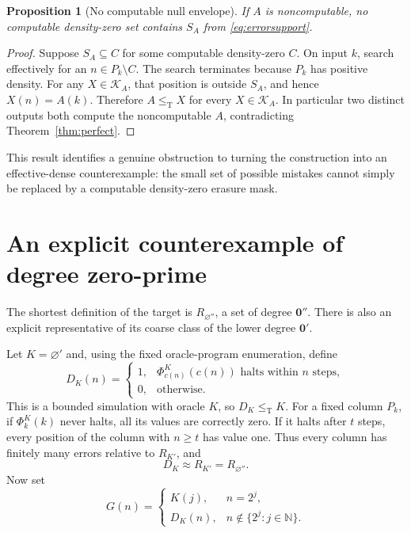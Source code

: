 \documentclass[11pt,a4paper]{article}
\newcommand{\N}{\mathbb N}
\newcommand{\leT}{\leq_{\mathrm T}}
\newcommand{\zero}{\mathbf 0}
\newtheorem{proposition}[theorem]{Proposition}
\theoremstyle{definition}\newtheorem{definition}[theorem]{Definition}
\theoremstyle{remark}\newtheorem{remark}[theorem]{Remark}
\begin{document}
\begin{proposition}[No computable null envelope]\label{prop:envelope}
If $A$ is noncomputable, no computable density-zero set contains $S_A$ from \eqref{eq:errorsupport}.
\end{proposition}
\begin{proof}
Suppose $S_A\subseteq C$ for some computable density-zero $C$. On input $k$, search effectively for an $n\in P_k\setminus C$. The search terminates because $P_k$ has positive density. For any $X\in\mathcal K_A$, that position is outside $S_A$, and hence $X(n)=A(k)$. Therefore $A\leT X$ for every $X\in\mathcal K_A$. In particular two distinct outputs both compute the noncomputable $A$, contradicting Theorem~\ref{thm:perfect}.
\end{proof}

This result identifies a genuine obstruction to turning the construction into an effective-dense counterexample: the small set of possible mistakes cannot simply be replaced by a computable density-zero erasure mask.

\section{An explicit counterexample of degree zero-prime}
\label{sec:explicit}
The shortest definition of the target is $R_{\varnothing''}$, a set of degree $\zero''$. There is also an explicit representative of its coarse class of the lower degree $\zero'$.

Let $K=\varnothing'$ and, using the fixed oracle-program enumeration, define
\begin{equation}\label{eq:DK}
 D_K(n)=\begin{cases}
 1,&\Phi_{c(n)}^K(c(n))\text{ halts within }n\text{ steps},\\
 0,&\text{otherwise}.
 \end{cases}
\end{equation}
This is a bounded simulation with oracle $K$, so $D_K\leT K$. For a fixed column $P_k$, if $\Phi_k^K(k)$ never halts, all its values are correctly zero. If it halts after $t$ steps, every position of the column with $n\geq t$ has value one. Thus every column has finitely many errors relative to $R_{K'}$, and
\[
 D_K\approx R_{K'}=R_{\varnothing''}.
\]
Now set
\begin{equation}\label{eq:G}
 G(n)=\begin{cases}
 K(j),&n=2^j,\\
 D_K(n),&n\notin\{2^j:j\in\N\}.
 \end{cases}
\end{equation}
\end{document}
